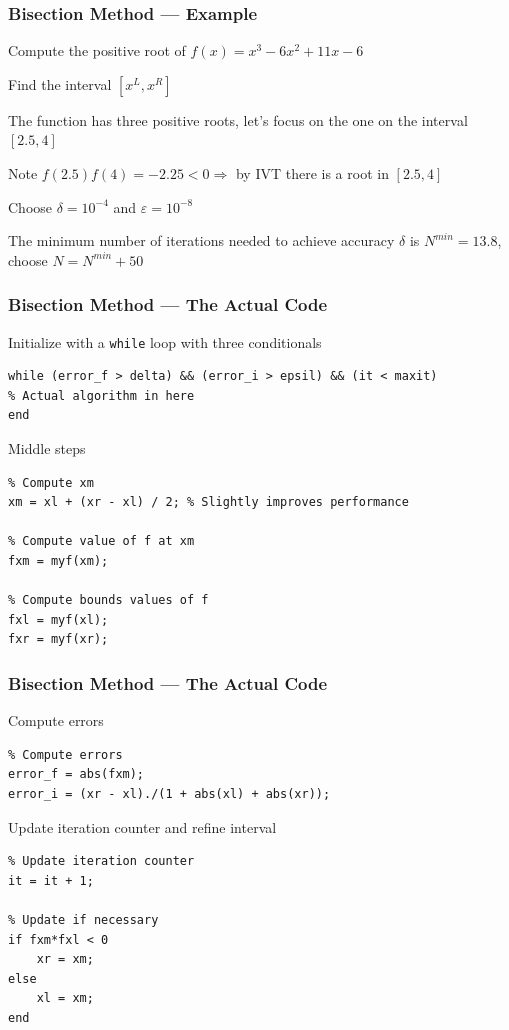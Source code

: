 \documentclass[11pt,xcolor={svgnames},aspectratio=169,usepdftitle=false]{beamer}
\let\toneitemize\itemize
\let\ttwoitemize\enditemize
\renewenvironment{itemize}{\toneitemize\addtolength{\itemsep}{0.7\baselineskip}}{\ttwoitemize}
\let\toneenumer\enumerate
\let\ttwoenumer\endenumerate
\renewenvironment{enumerate}{\toneenumer\addtolength{\itemsep}{0.7\baselineskip}}{\ttwoenumer}
\begin{document}
\begin{frame}
  \frametitle{Bisection Method --- Example}
Compute the positive root of $f(x) = x^3 - 6x^2 + 11x - 6$
\begin{enumerate}
  \item Find the interval $[x^L, x^R]$
  \item The function has three positive roots, let's focus on the one on the interval $[2.5, 4]$
  \item Note $f(2.5)f(4) = -2.25 < 0 \Rightarrow$ by IVT there is a root in $[2.5, 4]$
  \item Choose $\delta = 10^{-4}$ and $\varepsilon = 10^{-8}$
  \item The minimum number of iterations needed to achieve accuracy $\delta$ is $N^{min} = 13.8$, choose $N = N^{min} + 50$
\end{enumerate}
\end{frame}

\begin{frame}[fragile]
  \frametitle{Bisection Method --- The Actual Code}
  \begin{itemize}
    \item Initialize with a \verb;while; loop with three conditionals
\begin{lstlisting}
while (error_f > delta) && (error_i > epsil) && (it < maxit)
% Actual algorithm in here
end     
\end{lstlisting}
    \item Middle steps
\begin{lstlisting}
% Compute xm
xm = xl + (xr - xl) / 2; % Slightly improves performance

% Compute value of f at xm
fxm = myf(xm);

% Compute bounds values of f
fxl = myf(xl);
fxr = myf(xr);
\end{lstlisting}
\end{itemize}
\end{frame}

\begin{frame}[fragile]
  \frametitle{Bisection Method --- The Actual Code}
\begin{itemize}
  \item Compute errors
\begin{lstlisting}
% Compute errors
error_f = abs(fxm);
error_i = (xr - xl)./(1 + abs(xl) + abs(xr));
\end{lstlisting}
\item Update iteration counter and refine interval
\begin{lstlisting}
% Update iteration counter
it = it + 1;

% Update if necessary
if fxm*fxl < 0
    xr = xm;
else
    xl = xm;
end
\end{lstlisting}
\end{itemize}
\end{frame}
\end{document}
